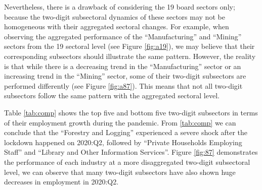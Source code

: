\documentclass{monashthesis}
\begin{document}
Nevertheless, there is a drawback of considering the 19 board sectors only; because the two-digit subsectoral dynamics of these sectors may not be homogeneous with their aggregated sectoral changes. For example, when observing the aggregated performance of the ``Manufacturing'' and ``Mining'' sectors from the 19 sectoral level (see Figure \ref{fig:a19}), we may believe that their corresponding subsectors should illustrate the same pattern. However, the reality is that while there is a decreasing trend in the ``Manufacturing'' sector or an increasing trend in the ``Mining'' sector, some of their two-digit subsectors are performed differently (see Figure \ref{fig:a87}). This means that not all two-digit subsectors follow the same pattern with the aggregated sectoral level.

Table \ref{tab:comp} shows the top five and bottom five two-digit subsectors in terms of their employment growth during the pandemic. From \ref{tab:comp} we can conclude that the ``Forestry and Logging'' experienced a severe shock after the lockdown happened on 2020:Q2, followed by ``Private Households Employing Staff'' and ``Library and Other Information Services''. Figure \ref{fig:87} demonstrates the performance of each industry at a more disaggregated two-digit subsectoral level, we can observe that many two-digit subsectors have also shown huge decreases in employment in 2020:Q2.
\end{document}
